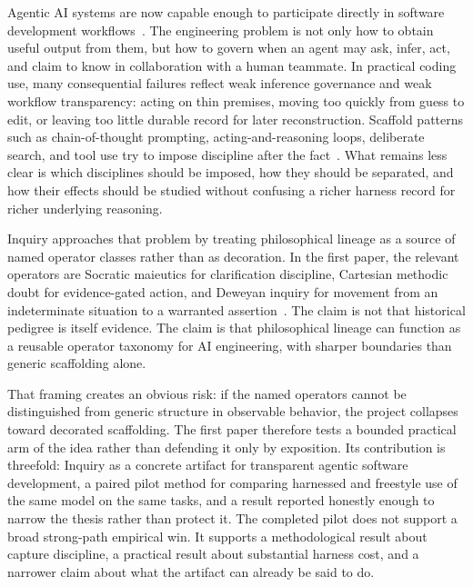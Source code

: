 \documentclass[conference]{IEEEtran}
\begin{document}
Agentic AI systems are now capable enough to participate directly in software
development workflows~\cite{brown2020gpt3}. The engineering problem is not only how to
obtain useful output from them, but how to govern when an agent may ask, infer, act,
and claim to know in collaboration with a human teammate. In practical coding use,
many consequential failures reflect weak inference governance and weak workflow
transparency: acting on thin premises, moving too quickly from guess to edit, or
leaving too little durable record for later reconstruction. Scaffold patterns such as
chain-of-thought prompting, acting-and-reasoning loops, deliberate search, and tool use
try to impose discipline after the fact~\cite{wei2022cot,yao2023react,yao2023tot,schick2023toolformer}.
What remains less clear is which disciplines should be imposed, how they should be
separated, and how their effects should be studied without confusing a richer harness
record for richer underlying reasoning.

Inquiry approaches that problem by treating philosophical lineage as a source of named
operator classes rather than as decoration. In the first paper, the relevant operators
are Socratic maieutics for clarification discipline, Cartesian methodic doubt for
evidence-gated action, and Deweyan inquiry for movement from an indeterminate situation
to a warranted assertion~\cite{plato_theaetetus,descartes_discourse,descartes_meditations,dewey_htwt,dewey_logic,peirce_cp}.
The claim is not that historical pedigree is itself evidence. The claim is that
philosophical lineage can function as a reusable operator taxonomy for AI engineering,
with sharper boundaries than generic scaffolding alone.

That framing creates an obvious risk: if the named operators cannot be distinguished
from generic structure in observable behavior, the project collapses toward decorated
scaffolding. The first paper therefore tests a bounded practical arm of the idea rather
than defending it only by exposition. Its contribution is threefold: Inquiry as a
concrete artifact for transparent agentic software development, a paired pilot method
for comparing harnessed and freestyle use of the same model on the same tasks, and a
result reported honestly enough to narrow the thesis rather than protect it. The
completed pilot does not support a broad strong-path empirical win. It supports a
methodological result about capture discipline, a practical result about substantial
harness cost, and a narrower claim about what the artifact can already be said to do.
\end{document}
